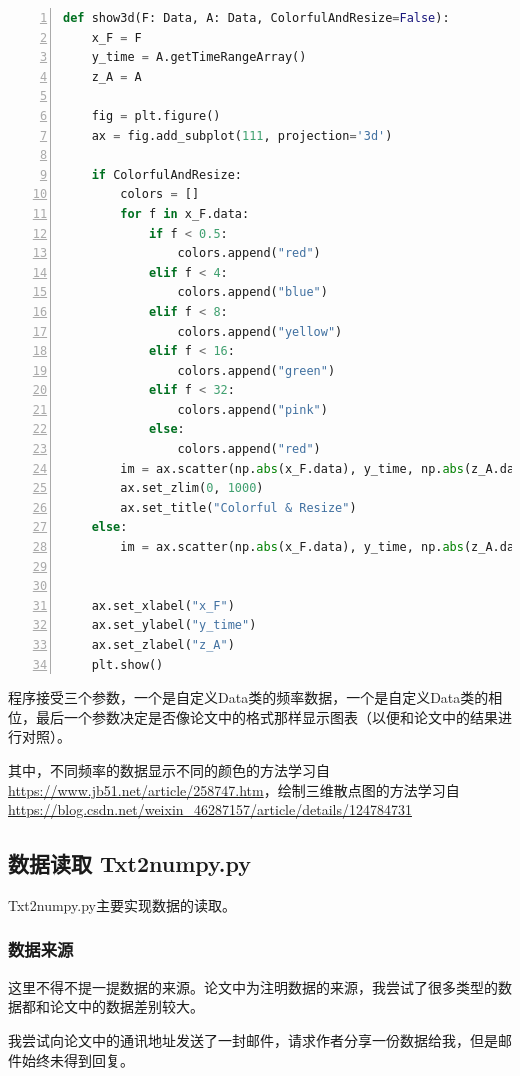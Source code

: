 \documentclass[cs4size,a4paper]{ctexart}
\numberwithin{equation}{section}
\numberwithin{table}{section}
\numberwithin{figure}{section}
\begin{document}
\begin{lstlisting}[language={python},
numbers=left,
numberstyle=\tiny\monaco,
basicstyle=\footnotesize\monaco]
def show3d(F: Data, A: Data, ColorfulAndResize=False):
    x_F = F
    y_time = A.getTimeRangeArray()
    z_A = A

    fig = plt.figure()
    ax = fig.add_subplot(111, projection='3d')

    if ColorfulAndResize:
        colors = []
        for f in x_F.data:
            if f < 0.5:
                colors.append("red")
            elif f < 4:
                colors.append("blue")
            elif f < 8:
                colors.append("yellow")
            elif f < 16:
                colors.append("green")
            elif f < 32:
                colors.append("pink")
            else:
                colors.append("red")
        im = ax.scatter(np.abs(x_F.data), y_time, np.abs(z_A.data), c=colors, s=1)  # s: 点的大小
        ax.set_zlim(0, 1000)
        ax.set_title("Colorful & Resize")
    else:
        im = ax.scatter(np.abs(x_F.data), y_time, np.abs(z_A.data), s=1)  # s: 点的大小
        

    ax.set_xlabel("x_F")
    ax.set_ylabel("y_time")
    ax.set_zlabel("z_A")
    plt.show()

\end{lstlisting}

程序接受三个参数，一个是自定义Data类的频率数据，一个是自定义Data类的相位，最后一个参数决定是否像论文中的格式那样显示图表（以便和论文中的结果进行对照）。


其中，不同频率的数据显示不同的颜色的方法学习自\url{https://www.jb51.net/article/258747.htm}，绘制三维散点图的方法学习自\url{https://blog.csdn.net/weixin\_46287157/article/details/124784731}



\subsection{数据读取 Txt2numpy.py}

\colorbox{LetMeFlyGray}{Txt2numpy.py}主要实现数据的读取。

\subsubsection{数据来源}

这里不得不提一提数据的来源。论文中为注明数据的来源，我尝试了很多类型的数据都和论文中的数据差别较大。

我尝试向论文中的通讯地址发送了一封邮件，请求作者分享一份数据给我，但是邮件始终未得到回复。
\end{document}

